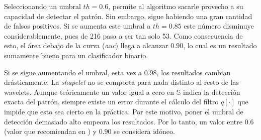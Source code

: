 Seleccionando un umbral $th=0.6$, permite al algoritmo sacarle provecho a su capacidad de detectar el patrón. Sin embargo,
sigue habiendo una gran cantidad de falsos positivos. Si se aumenta este umbral a $th=0.85$ este número
disminuye considerablemente, pues de 216 pasa a ser tan solo 53. Como consecuencia de esto, el área debajo de la curva
(\textit{auc}) llega a alcanzar $0.90$, lo cual es un resultado sumamente bueno para un clasificador binario.

Si se sigue aumentando el umbral, esta vez a $0.98$, los resultados cambian drásticamente. La \textit{shapelet} no
se comporta para nada distinto al resto de las wavelets. Aunque teóricamente un valor igual a cero en $\mathbb{S}$ indica
la detección exacta del patrón, siempre existe un error durante el cálculo del filtro $q[\cdot]$ que impide que esto sea
cierto en la práctica. Por este motivo, poner el umbral de detección demasiado alto empeora los resultados.
Por lo tanto, un valor entre $0.6$ (valor que recomiendan en \cite{Guido2018}) y $0.90$ se considera idóneo.


